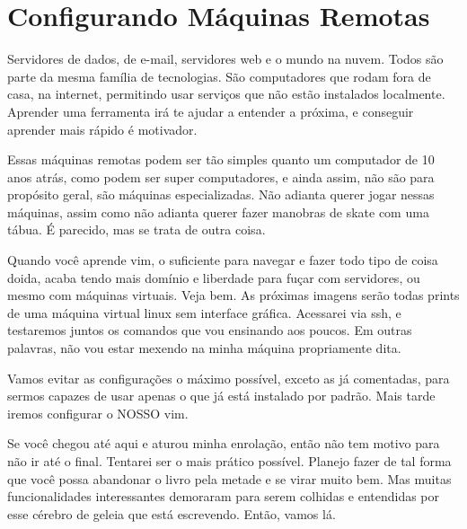
\section{Configurando Máquinas Remotas}
Servidores de dados, de e-mail, servidores web e o mundo na nuvem.
Todos são parte da mesma família de tecnologias.
São computadores que rodam fora de casa, na internet, permitindo usar serviços que não estão instalados localmente.
Aprender uma ferramenta irá te ajudar a entender a próxima, e conseguir aprender mais rápido é motivador.

Essas máquinas remotas podem ser tão simples quanto um computador de 10 anos atrás,
como podem ser super computadores, e ainda assim, não são para propósito geral, são máquinas especializadas.
Não adianta querer jogar nessas máquinas, assim como não adianta querer fazer manobras de skate com uma tábua.
É parecido, mas se trata de outra coisa.

Quando você aprende vim, o suficiente para navegar e fazer todo tipo de coisa doida,
acaba tendo mais domínio e liberdade para fuçar com servidores, ou mesmo com máquinas virtuais.
Veja bem. As próximas imagens serão todas prints de uma máquina virtual linux sem interface gráfica.
Acessarei via ssh, e testaremos juntos os comandos que vou ensinando aos poucos.
Em outras palavras, não vou estar mexendo na minha máquina propriamente dita.

Vamos evitar as configurações o máximo possível, exceto as já comentadas, para sermos capazes de usar
apenas o que já está instalado por padrão.
Mais tarde iremos configurar o NOSSO vim.

Se você chegou até aqui e aturou minha enrolação, então não tem motivo para não ir até o final.
Tentarei ser o mais prático possível.
Planejo fazer de tal forma que você possa abandonar o livro pela metade e se virar muito bem.
Mas muitas funcionalidades interessantes demoraram para serem colhidas e entendidas por esse cérebro
de geleia que está escrevendo. Então, vamos lá.

\newpage
